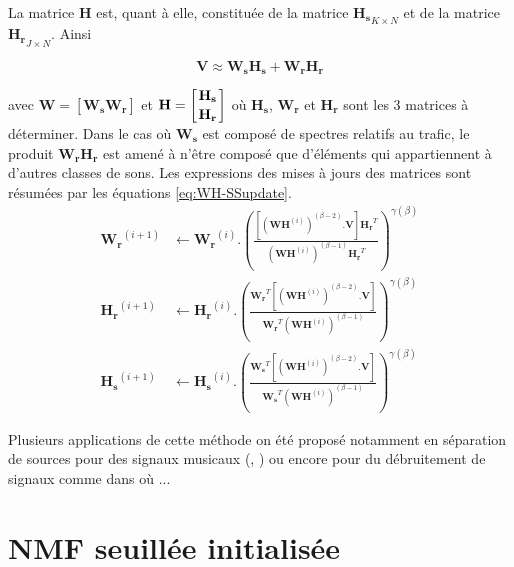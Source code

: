 La matrice $\mathbf{H}$ est, quant à elle, constituée de la matrice $\mathbf{H_s}_{K \times N}$ et de la matrice $\mathbf{H_r}_{J \times N}$. Ainsi 

\begin{equation}
\mathbf{V} \approx \mathbf{W_s} \mathbf{H_s} + \mathbf{W_r} \mathbf{H_r}
\end{equation}

avec $\mathbf{W} = \left[ \mathbf{W_s} \mathbf{W_r} \right]$ et $\mathbf{H} = \left[ \genfrac{}{}{0pt}{0}{\mathbf{H_s}}{\mathbf{H_r}} \right]$ où $\mathbf{H_s}$, $\mathbf{W_r}$ et $\mathbf{H_r}$ sont les 3 matrices à déterminer. Dans le cas où $\mathbf{W_s}$ est composé de spectres relatifs au trafic, le produit $\mathbf{W_r} \mathbf{H_r}$ est amené à n'être composé que d'éléments qui appartiennent à d'autres classes de sons. Les expressions des mises à jours des matrices sont résumées par les équations \ref{eq:WH-SSupdate}. \\ 

\begin{subequations}\label{eq:WH-SSupdate}
\begin{align}
\mathbf{W_r}^{(i+1)} &\leftarrow \mathbf{W_r}^{(i)}.\left(\frac{\left[\left(\mathbf{WH}^{(i)} \right)^{(\beta-2)}.\mathbf{V} \right]\mathbf{H_r}^T}{\left(\mathbf{WH}^{(i)} \right)^{(\beta-1)}\mathbf{H_r}^T}\right)^{\gamma(\beta)}\\
\mathbf{H_r}^{(i+1)} &\leftarrow \mathbf{H_r}^{(i)}.\left(\frac{\mathbf{W_r}^T \left[\left(\mathbf{WH}^{(i)} \right)^{(\beta-2)}.\mathbf{V} \right]}{\mathbf{W_r}^T \left(\mathbf{WH}^{(i)} \right)^{(\beta-1)}}\right)^{\gamma(\beta)}\label{eq:H_r_SS}\\
\mathbf{H_s}^{(i+1)} &\leftarrow \mathbf{H_s}^{(i)}.\left(\frac{\mathbf{W_s}^T \left[\left(\mathbf{WH}^{(i)} \right)^{(\beta-2)}.\mathbf{V} \right]}{\mathbf{W_s}^T \left(\mathbf{WH}^{(i)} \right)^{(\beta-1)}}\right)^{\gamma(\beta)}\label{eq:H_s_SS}
\end{align}
\end{subequations}

Plusieurs applications de cette méthode on été proposé notamment en séparation de sources pour des signaux musicaux (\cite{smaragdis_supervised_2007}, \cite{duan_online_2012}) ou encore pour du débruitement de signaux comme dans \cite{mysore_non-negative_2011} où ... 

\section{NMF seuillée initialisée}\label{sec:NMF_TI}


